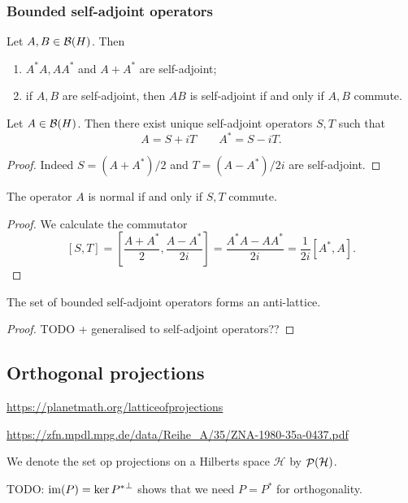 \subsubsection{Bounded self-adjoint operators}
\begin{lemma}
Let $A, B\in\operatorname{\mathcal{B}}(H)$. Then
\begin{enumerate}
\item $A^*A, AA^*$ and $A+A^*$ are self-adjoint;
\item if $A,B$ are self-adjoint, then $AB$ is self-adjoint \textup{if and only if} $A,B$ commute.
\end{enumerate}
\end{lemma}
\begin{corollary}
Let $A\in\operatorname{\mathcal{B}}(H)$. Then there exist unique self-adjoint operators $S,T$ such that
\[ A = S+iT \qquad A^* = S-iT. \]
\end{corollary}
\begin{proof}
Indeed $S = (A+A^*)/2$ and $T = (A-A^*)/2i$ are self-adjoint.
\end{proof}
\begin{corollary}
The operator $A$ is normal \textup{if and only if} $S,T$ commute.
\end{corollary}
\begin{proof}
We calculate the commutator
\[ [S,T] = \left[\frac{A+A^*}{2}, \frac{A-A^*}{2i}\right] = \frac{A^*A - AA^*}{2i} = \frac{1}{2i}[A^*, A]. \]
\end{proof}

\begin{proposition}
The set of bounded self-adjoint operators forms an anti-lattice.
\end{proposition}
\begin{proof}
TODO + generalised to self-adjoint operators??
\end{proof}

\subsection{Orthogonal projections}
\url{https://planetmath.org/latticeofprojections}

\url{https://zfn.mpdl.mpg.de/data/Reihe_A/35/ZNA-1980-35a-0437.pdf}

We denote the set op projections on a Hilberts space $\mathcal{H}$ by $\mathop{\mathcal{P}}\nolimits(\mathcal{H})$.

TODO: $\operatorname{im}(P) = \ker{P^*}^\perp$ shows that we need $P= P^*$ for orthogonality.

